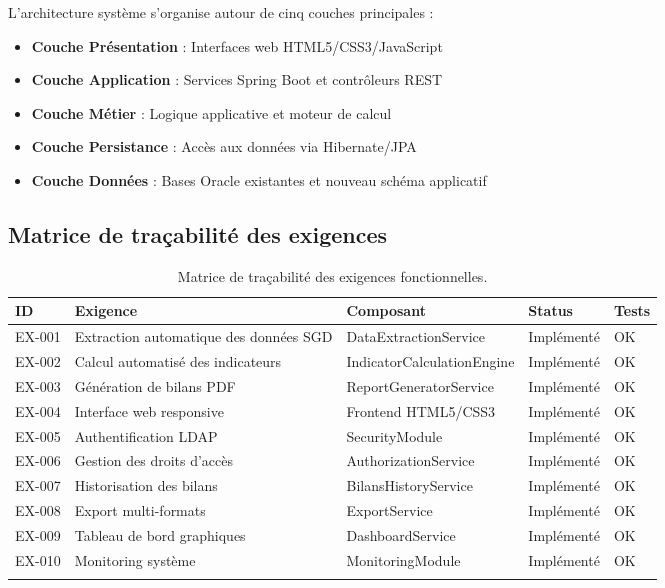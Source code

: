 L'architecture système s'organise autour de cinq couches principales :

\begin{itemize}
    \item \textbf{Couche Présentation} : Interfaces web HTML5/CSS3/JavaScript
    \item \textbf{Couche Application} : Services Spring Boot et contrôleurs REST
    \item \textbf{Couche Métier} : Logique applicative et moteur de calcul
    \item \textbf{Couche Persistance} : Accès aux données via Hibernate/JPA
    \item \textbf{Couche Données} : Bases Oracle existantes et nouveau schéma applicatif
\end{itemize}

\subsection{Matrice de traçabilité des exigences}

\begin{longtable}{|p{1cm}|p{6cm}|p{3cm}|p{3cm}|p{2cm}|}
    \hline
    \textbf{ID} & \textbf{Exigence}                      & \textbf{Composant}         & \textbf{Status} & \textbf{Tests} \\ \hline
    EX-001      & Extraction automatique des données SGD & DataExtractionService      & Implémenté      & OK             \\ \hline
    EX-002      & Calcul automatisé des indicateurs      & IndicatorCalculationEngine & Implémenté      & OK             \\ \hline
    EX-003      & Génération de bilans PDF               & ReportGeneratorService     & Implémenté      & OK             \\ \hline
    EX-004      & Interface web responsive               & Frontend HTML5/CSS3        & Implémenté      & OK             \\ \hline
    EX-005      & Authentification LDAP                  & SecurityModule             & Implémenté      & OK             \\ \hline
    EX-006      & Gestion des droits d'accès             & AuthorizationService       & Implémenté      & OK             \\ \hline
    EX-007      & Historisation des bilans               & BilansHistoryService       & Implémenté      & OK             \\ \hline
    EX-008      & Export multi-formats                   & ExportService              & Implémenté      & OK             \\ \hline
    EX-009      & Tableau de bord graphiques             & DashboardService           & Implémenté      & OK             \\ \hline
    EX-010      & Monitoring système                     & MonitoringModule           & Implémenté      & OK             \\ \hline
    \caption{Matrice de traçabilité des exigences fonctionnelles.}
    \label{tab:traçabilite-exigences}
\end{longtable}

